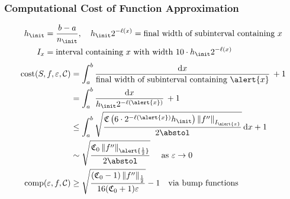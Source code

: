 \documentclass[10pt,compress,xcolor={usenames,dvipsnames},aspectratio=169]{beamer}
\begin{document}
\begin{frame}
	\frametitle{Computational Cost of Function Approximation}
	\vspace{-6.5ex}
	\begin{align*}
	h_{\init}  &= \frac{b-a}{n_{\init}},  \quad  h_{\init} 2^{-\ell(x)} = \text{final width of subinterval containing } x \\
	I_{x}& =\text{interval containing $x$ with width } 10 \cdot h_{\init} 2^{-\ell(x)} \\
	\end{align*}
	\vspace{-6ex}
	\begin{align*}
	\cost(S,f,\varepsilon,\cc) 
	&= \int_a^b \frac{\dif x}{\text{final width of subinterval containing } \alert{x}} \,  + 1\\
	&= \int_a^b \frac{\dif x}{h_{\init} 2^{-\ell(\alert{x})}} \,  + 1\\
	&\le \int_a^b \sqrt{\frac{\fC\left(6\cdot 2^{-\ell(\alert{x})} h_{\init}\right) \norm[I_{\alert{x}}]{f''} }{2 \abstol}}  \, \dif x + 1\\
	& \sim \sqrt{\frac{\fC_0 \norm[\alert{\frac 12}]{f''}}{2\abstol}}  \quad \text{ as } \varepsilon \to 0 \\
	\comp(\varepsilon,f,\cc) &\ge \sqrt{\frac{(\fC_0-1)  \norm[\frac12]{f''} }{16(\fC_0+1)\varepsilon}} -1 \quad \text{via bump functions}
	\end{align*}
\end{frame}
\end{document}
